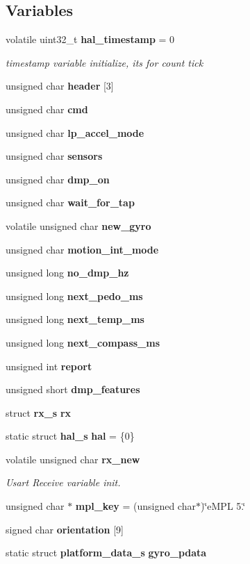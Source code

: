 \subsection*{Variables}
\begin{DoxyCompactItemize}
\item 
volatile uint32\+\_\+t \textbf{ hal\+\_\+timestamp} = 0
\begin{DoxyCompactList}\small\item\em timestamp variable initialize, its for count tick \end{DoxyCompactList}\item 
unsigned char \textbf{ header} [3]
\item 
unsigned char \textbf{ cmd}
\item 
unsigned char \textbf{ lp\+\_\+accel\+\_\+mode}
\item 
unsigned char \textbf{ sensors}
\item 
unsigned char \textbf{ dmp\+\_\+on}
\item 
unsigned char \textbf{ wait\+\_\+for\+\_\+tap}
\item 
volatile unsigned char \textbf{ new\+\_\+gyro}
\item 
unsigned char \textbf{ motion\+\_\+int\+\_\+mode}
\item 
unsigned long \textbf{ no\+\_\+dmp\+\_\+hz}
\item 
unsigned long \textbf{ next\+\_\+pedo\+\_\+ms}
\item 
unsigned long \textbf{ next\+\_\+temp\+\_\+ms}
\item 
unsigned long \textbf{ next\+\_\+compass\+\_\+ms}
\item 
unsigned int \textbf{ report}
\item 
unsigned short \textbf{ dmp\+\_\+features}
\item 
struct \textbf{ rx\+\_\+s} \textbf{ rx}
\item 
static struct \textbf{ hal\+\_\+s} \textbf{ hal} = \{0\}
\item 
volatile unsigned char \textbf{ rx\+\_\+new}
\begin{DoxyCompactList}\small\item\em Usart Receive variable init. \end{DoxyCompactList}\item 
unsigned char $\ast$ \textbf{ mpl\+\_\+key} = (unsigned char$\ast$)\char`\"{}e\+M\+PL 5.\char`\"{}
\item 
signed char \textbf{ orientation} [9]
\item 
static struct \textbf{ platform\+\_\+data\+\_\+s} \textbf{ gyro\+\_\+pdata}
\end{DoxyCompactItemize}



